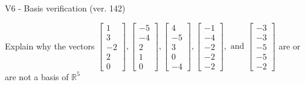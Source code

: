 \begin{exercise}
  \begin{exerciseTitle}V6 - Basis verification (ver. 142)\end{exerciseTitle}
  \begin{exerciseStatement}
    Explain why the vectors \(\left[\begin{array}{r}
1 \\
3 \\
-2 \\
2 \\
0
\end{array}\right] , \left[\begin{array}{r}
-5 \\
-4 \\
2 \\
1 \\
0
\end{array}\right] , \left[\begin{array}{r}
4 \\
-5 \\
3 \\
0 \\
-4
\end{array}\right] , \left[\begin{array}{r}
-1 \\
-4 \\
-2 \\
-2 \\
-2
\end{array}\right] , \text{ and } \left[\begin{array}{r}
-3 \\
-3 \\
-5 \\
-5 \\
-2
\end{array}\right]\) are or are not a basis of \(\mathbb{R}^5\)	



\end{exerciseStatement}
\end{exercise}
